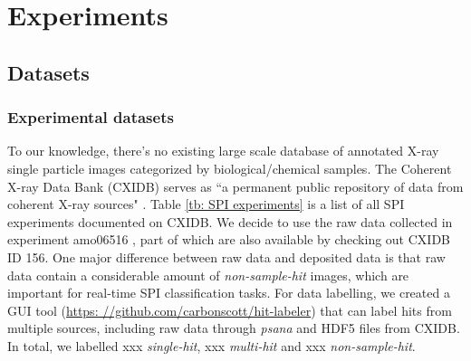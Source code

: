 \section{Experiments}

\subsection{Datasets}

\subsubsection{Experimental datasets}

To our knowledge, there's no existing large scale database of annotated X-ray
single particle images categorized by biological/chemical samples.  The Coherent
X-ray Data Bank (CXIDB) serves as ``a permanent public repository of data from
coherent X-ray sources" \cite{maiaCoherentXrayImaging2012}.  Table \ref{tb: SPI
experiments} is a list of all SPI experiments documented on CXIDB.  We decide to
use the raw data collected in experiment amo06516
\cite{liDiffractionDataAerosolized2020}, part of which are also available by
checking out CXIDB ID 156.  One major difference between raw data and deposited
data is that raw data contain a considerable amount of \textit{non-sample-hit}
images, which are important for real-time SPI classification tasks.  For data
labelling, we created a GUI tool (\url{https:
//github.com/carbonscott/hit-labeler}) that can label hits from multiple sources,
including raw data through \textit{psana} \cite{damianiLinacCoherentLight2016}
and HDF5 files from CXIDB.  In total, we labelled {\color{red}xxx}
\textit{single-hit}, xxx \textit{multi-hit} and xxx \textit{non-sample-hit}.  

